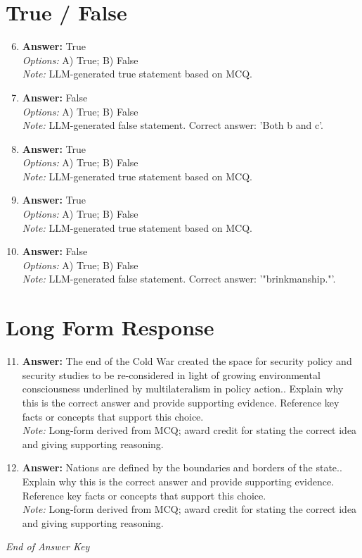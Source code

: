 \documentclass[12pt]{article}
\begin{document}
\section*{True / False}
\begin{enumerate}[label=\arabic*.]
\setcounter{enumi}{5}
\item \textbf{Answer:} True
\\ \textit{Options:} A) True; B) False
\\ \textit{Note:} LLM-generated true statement based on MCQ.
\item \textbf{Answer:} False
\\ \textit{Options:} A) True; B) False
\\ \textit{Note:} LLM-generated false statement. Correct answer: 'Both b and c'.
\item \textbf{Answer:} True
\\ \textit{Options:} A) True; B) False
\\ \textit{Note:} LLM-generated true statement based on MCQ.
\item \textbf{Answer:} True
\\ \textit{Options:} A) True; B) False
\\ \textit{Note:} LLM-generated true statement based on MCQ.
\item \textbf{Answer:} False
\\ \textit{Options:} A) True; B) False
\\ \textit{Note:} LLM-generated false statement. Correct answer: '"brinkmanship."'.
\end{enumerate}

\section*{Long Form Response}
\begin{enumerate}[label=\arabic*.]
\setcounter{enumi}{10}
\item \textbf{Answer:} The end of the Cold War created the space for security policy and security studies to be re-considered in light of growing environmental consciousness underlined by multilateralism in policy action.. Explain why this is the correct answer and provide supporting evidence. Reference key facts or concepts that support this choice.
\\ \textit{Note:} Long-form derived from MCQ; award credit for stating the correct idea and giving supporting reasoning.
\item \textbf{Answer:} Nations are defined by the boundaries and borders of the state.. Explain why this is the correct answer and provide supporting evidence. Reference key facts or concepts that support this choice.
\\ \textit{Note:} Long-form derived from MCQ; award credit for stating the correct idea and giving supporting reasoning.
\end{enumerate}

\vfill
\noindent\textit{End of Answer Key}
\end{document}
